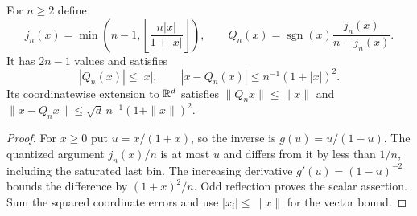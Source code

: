 \begin{lemma}\label{lem:v6-compander}
For $n\ge2$ define
\[
 j_n(x)=\min\left(n-1,\left\lfloor\frac{n|x|}{1+|x|}\right\rfloor\right),
 \qquad Q_n(x)=\operatorname{sgn}(x)\frac{j_n(x)}{n-j_n(x)}.
\]
It has $2n-1$ values and satisfies
\begin{equation}
 |Q_n(x)|\le|x|,\qquad |x-Q_n(x)|\le n^{-1}(1+|x|)^2.
                                                        \label{eq:v6-compander}
\end{equation}
Its coordinatewise extension to $\mathbb R^d$ satisfies
$\|Q_nx\|\le\|x\|$ and
$\|x-Q_nx\|\le\sqrt d\,n^{-1}(1+\|x\|)^2$.
\end{lemma}
\begin{proof}
For $x\ge0$ put $u=x/(1+x)$, so the inverse is $g(u)=u/(1-u)$.
The quantized argument $j_n(x)/n$ is at most $u$ and differs from it
by less than $1/n$, including the saturated last bin. The increasing
derivative $g'(u)=(1-u)^{-2}$ bounds the difference by
$(1+x)^2/n$. Odd reflection proves the scalar assertion. Sum the
squared coordinate errors and use $|x_i|\le\|x\|$ for the vector bound.
\end{proof}

